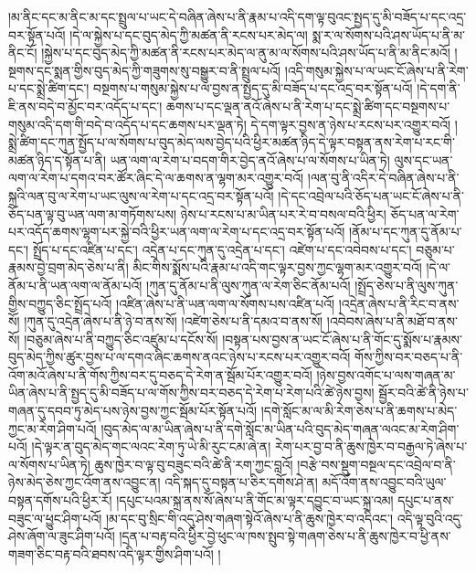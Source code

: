 །མ་ནིང་དང་མ་ནིང་མ་དང་སྤྲུལ་པ་ཡང་དེ་བཞིན་ཞེས་པ་ནི་རྣམ་པ་འདི་དག་ལྟ་བུའང་སྤྱད་དུ་མི་བཟོད་པ་དང་འདྲ་བར་སྟོན་པའོ། །དེ་ལ་སྐྱེས་པ་དང་བུད་མེད་ཀྱི་མཚན་ནི་རངས་པར་མེད་ལ། སྨ་ར་ལ་སོགས་པའི་ཤས་ཡོད་པ་ནི་མ་ནིང་ངོ། །སྐྱེས་པ་དང་བུད་མེད་ཀྱི་མཚན་ནི་རངས་པར་མེད་ལ་ནུ་མ་ལ་སོགས་པའི་ཤས་ཡོད་པ་ནི་མ་ནིང་མའོ། །སྔགས་དང་སྨན་གྱིས་བུད་མེད་ཀྱི་གཟུགས་སུ་བསྒྱུར་བ་ནི་སྤྲུལ་པའོ། །འདི་གསུམ་སྐྱེས་པ་ལ་ཡང་ངོ་ཞེས་པ་ནི་རེག་པ་དང་སྨྲེ་ཚིག་དང་། བསྔགས་པ་གསུམ་སྐྱེས་པ་ལ་བྱས་ན་སྤྱད་དུ་མི་བཟོད་པ་དང་འདྲ་བར་སྟོན་པའོ། །དེ་དག་ནི་ཇི་ནས་བདེ་བ་མྱོང་བར་འདོད་པ་དང་། ཆགས་པ་དང་ལྡན་ནའོ་ཞེས་པ་ནི་རེག་པ་དང་སྨྲེ་ཚིག་དང་བསྔགས་པ་གསུམ་འདི་དག་གི་བདེ་བ་འདོད་པ་དང་ཆགས་པར་ལྡན་ཏེ། དེ་དག་ལྟར་བྱས་ན་ཉེས་པ་རངས་པར་འགྱུར་བའོ། །སྨྲེ་ཚིག་དང་ཀུན་སྤྱོད་པ་ལ་སོགས་པ་བུད་མེད་ལས་བྱེད་པའི་ཕྱིར་མཚན་ཉིད་དེ་ལྟར་བསྟན་ནས་རེག་པ་རང་གི་མཚན་ཉིད་ད་སྟོན་པ་ནི། ཡན་ལག་ལ་རེག་པ་བདག་གིར་བྱེད་ནའོ་ཞེས་པ་ལ་སོགས་པ་ཡིན་ཏེ། ལུས་དང་ཡན་ལག་ལ་རེག་པ་དགའ་བར་ཚོར་ཞིང་དེ་ལ་ཆགས་ན་ལྷག་མར་འགྱུར་བའོ། །ལན་བུ་ནི་འདིར་དེ་བཞིན་ཞེས་པ་ནི་སྐྲའི་ལན་བུ་ལ་རེག་པ་ཡང་ལུས་ལ་རེག་པ་དང་འདྲ་བར་སྟོན་པའོ། །དེ་དང་འབྲེལ་པའི་ཅོད་པན་ཡང་ངོ་ཞེས་པ་ནི་ཅོད་པན་ལྟ་བུ་ཡན་ལག་མ་གཏོགས་པས། ཉེས་པ་རངས་པ་མ་ཡིན་པར་རེ་བ་བསལ་བའི་ཕྱིར། ཅོད་པན་ལ་རེག་པར་འདོད་ཆགས་ལྷག་པར་སྐྱེ་བའི་ཕྱིར་ཡན་ལག་ལ་རེག་པ་དང་འདྲ་བར་སྟོན་པའོ། །ནོམ་པ་དང་ཀུན་དུ་ནོམ་པ་དང་། སྤྲོད་པ་དང་འཛིན་པ་དང་། འདྲེན་པ་དང་ཀུན་དུ་འདྲེན་པ་དང་། འཛེག་པ་དང་འབེབས་པ་དང་། བཅུམ་པ་རྣམས་བྱེ་བྲག་མེད་ཅེས་པ་ནི། མིང་གིས་སྨོས་པའི་རྣམ་པ་འདི་གང་ལྟར་བྱས་ཀྱང་ལྷག་མར་འགྱུར་བའོ། །དེ་ལ་ནོམ་པ་ནི་ཡན་ལག་ལ་ནོམ་པའོ། །ཀུན་དུ་ནོམ་པ་ནི་ལུས་ཀུན་ལ་རེག་ཅིང་ནོམ་པའོ། །སྤྲོད་ཅེས་པ་ནི་ལུས་ཀུན་གྱིས་བཀྱུད་ཅིང་སྤྲོད་པའོ། །འཛིན་ཞེས་པ་ནི་ཡན་ལག་ལ་སོགས་པས་འཛིན་པའོ། །འདྲེན་ཞེས་པ་ནི་རིང་བ་ནས་སོ། །ཀུན་དུ་འདྲེན་ཞེས་པ་ནི་ཉེ་བ་ནས་སོ། །འཛེག་ཅེས་པ་ནི་དམའ་བ་ནས་སོ། །འབེབས་ཞེས་པ་ནི་མཐོ་བ་ནས་སོ། །བཅུམ་ཞེས་པ་ནི་བཀྱུད་ཅིང་འཛུམ་པ་དངོས་སོ། །བསྟན་པས་བྱས་ན་ཡང་ངོ་ཞེས་པ་ནི་གོང་དུ་སྨོས་པ་རྣམས་བུད་མེད་ཀྱིས་ཚུར་བྱས་པ་ལ་དགའ་ཞིང་ཆགས་ནའང་ཉེས་པ་རངས་པར་འགྱུར་བའོ། གོས་ཀྱིས་བར་བཅད་པ་ནི་འོག་མའོ་ཞེས་པ་ནི་གོས་ཀྱིས་བར་དུ་བཅད་དེ་རེག་ན་སྦོམ་པོར་འགྱུར་བའོ། །ཉེས་བྱས་འགོང་པ་ལས་གཞན་མ་ཡིན་ཞེས་པ་ནི་སྤྱད་དུ་མི་བཟོད་པ་ལ་གོས་ཀྱིས་བར་བཅད་དེ་རེག་པ་རེག་པའི་ཚེ་ཉེས་བྱས། སྦྱོར་བའི་ཚེ་ནི་ཉེས་པ་གཞན་དུ་དབབ་ཏུ་མེད་པས་ཉེས་བྱས་ཀྱང་སྦོམ་པོར་སྟོན་པའོ། །དགེ་སློང་མ་ལ་མི་རེག་ཅེས་པ་ནི་ཆགས་པ་མེད་ཀྱང་མ་རེག་ཤིག་པའོ། །བུད་མེད་ལ་མ་ཡིན་ཞེས་པ་ནི་དགེ་སློང་མ་ཡིན་པའི་བུད་མེད་གཞན་ལའང་མ་རེག་ཤིག་པའོ། །དེ་ལྟར་ན་བུད་མེད་གང་ལའང་རེག་ཏུ་ཡེ་མི་རུང་ངམ་ཞེ་ན། རེག་པར་བྱ་བ་ནི་ཆུས་ཁྱེར་བ་བརྒྱལ་ཏེ་ཞེས་པ་ལ་སོགས་པ་ཡིན་ཏེ། ཆུས་ཁྱེར་བ་ལྟ་བུ་བཟུང་བའི་ཚེ་ནི་རག་ཀྱང་བླའོ། །བརྩེ་བས་སྡུག་བསྔལ་དང་འབྲེལ་བ་ནི་ཉེས་མེད་ཅེས་ཀྱང་འོག་ནས་འབྱུང་ན། འདི་སྐད་དུ་བསྟན་པ་ཅིར་དགོས་ཤེ་ན། མདོ་འོག་ནས་འབྱུང་བའི་ཡུལ་བསྟན་དགོས་པའི་ཕྱིར་རོ། །དཔུང་པའམ་སྐྲ་ནས་སོ་ཞེས་པ་ནི་གོང་མ་ལྟར་དབྱུང་བ་ཡང་སྐྲ་འམ། དཔུང་པ་ནས་བཟུང་ལ་ཕྱུང་ཤིག་པའོ། །མ་དང་བུ་སྲིང་གི་འདུ་ཤེས་གཞག་སྟེའོ་ཞེས་པ་ནི་ཆུས་ཁྱེར་བ་འདིའང་། འདི་ལྟ་བུའི་འདུ་ཤེས་ཞོག་ལ་ཟུང་ཤིག་པའོ། །དྲན་པ་བརྟ་བའི་ཕྱིར་བྱེ་ཕུང་ལ་ཁས་སྤུབ་སྟེ་གཞག་ཅེས་པ་ནི་ཆུས་ཁྱེར་བ་ཕྱི་ནས་གཟག་ཅིང་བརྟ་བའི་ཐབས་འདི་ལྟར་གྱིས་ཤིག་པའོ། །
